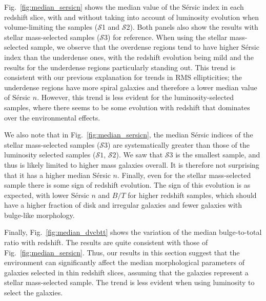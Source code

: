 \documentclass[twocolumn,useAMS,usenatbib]{mn2e}
\newcommand{\sersic}{S\'{e}rsic }
\newcommand{\s}{\ensuremath{\mathcal{S}}}
\begin{document}
Fig.~\ref{fig:median_sersicn} shows the median value of the \sersic
index in each redshift slice, with and without taking into account of
luminosity evolution when volume-limiting the samples (\s1 and
\s2). Both panels also show the results with stellar mass-selected
samples (\s3) for reference.  
When using the stellar mass-selected sample, we observe that the
overdense regions tend to have higher \sersic 
index than the underdense ones, with the redshift evolution being mild
and the results for the underdense regions particularly standing
out. This trend is consistent with our previous explanation for trends
in RMS ellipticities; the underdense regions have more spiral galaxies
and therefore a lower median value of \sersic $n$. 
However, this trend is less evident for the luminosity-selected
samples, where there seems to be some evolution with redshift that
dominates over the environmental effects.

We also note that in Fig.~\ref{fig:median_sersicn}, the median \sersic
indices of the stellar mass-selected samples (\s$3$) are
systematically greater than those of the luminosity selected samples
(\s$1$, \s$2$).  We saw that \s3 is the smallest sample, and thus is
likely limited to higher mass galaxies overall.  It is therefore not
surprising that it has a higher median \sersic $n$.  Finally, even for
the stellar mass-selected sample there is some sign of redshift
evolution.  The sign of this evolution is as expected, with lower
\sersic $n$ and $B/T$ for higher redshift samples, which should have a
higher fraction of disk and irregular galaxies and fewer galaxies with
bulge-like morphology.
 
Finally, Fig.~\ref{fig:median_dvcbtt} shows the variation of the median
bulge-to-total ratio with redshift. The results are quite consistent
with those of Fig.~\ref{fig:median_sersicn}. 
Thus, our results in this section suggest that the 
environment can significantly affect the median morphological
parameters of galaxies selected in thin redshift
slices, assuming that the galaxies represent a stellar mass-selected
sample.  The trend is less evident when using luminosity to select the
galaxies.
\end{document}
